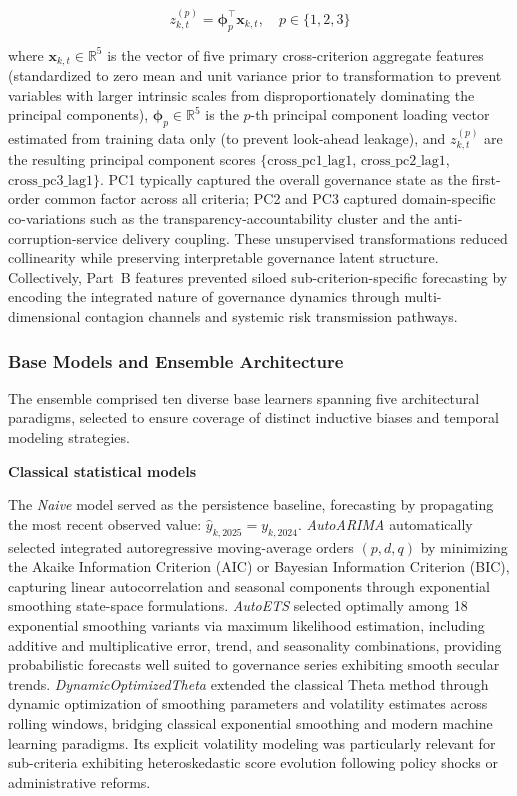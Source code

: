 \documentclass[12pt,a4paper]{article}
\begin{document}
\begin{equation}
\label{eq:pca}
z_{k,t}^{(p)} = \boldsymbol{\phi}_p^\top \mathbf{x}_{k,t}, \quad p \in \{1, 2, 3\}
\end{equation}

where $\mathbf{x}_{k,t} \in \mathbb{R}^{5}$ is the vector of five primary cross-criterion aggregate features (standardized to zero mean and unit variance prior to transformation to prevent variables with larger intrinsic scales from disproportionately dominating the principal components), $\boldsymbol{\phi}_p \in \mathbb{R}^{5}$ is the $p$-th principal component loading vector estimated from training data only (to prevent look-ahead leakage), and $z_{k,t}^{(p)}$ are the resulting principal component scores $\{\text{cross\_pc1\_lag1}$, $\text{cross\_pc2\_lag1}$, $\text{cross\_pc3\_lag1}\}$. PC1 typically captured the overall governance state as the first-order common factor across all criteria; PC2 and PC3 captured domain-specific co-variations such as the transparency-accountability cluster and the anti-corruption-service delivery coupling. These unsupervised transformations reduced collinearity while preserving interpretable governance latent structure. Collectively, Part~B features prevented siloed sub-criterion-specific forecasting by encoding the integrated nature of governance dynamics through multi-dimensional contagion channels and systemic risk transmission pathways.

\subsubsection{Base Models and Ensemble Architecture}
\label{subsubsec:base_models}

The ensemble comprised ten diverse base learners spanning five architectural paradigms, selected to ensure coverage of distinct inductive biases and temporal modeling strategies.

\textbf{Classical statistical models}

The \emph{Naive} model served as the persistence baseline, forecasting by propagating the most recent observed value: $\hat{y}_{k,2025} = y_{k,2024}$. \emph{AutoARIMA} \citep{Hyndman2008} automatically selected integrated autoregressive moving-average orders $(p,d,q)$ by minimizing the Akaike Information Criterion (AIC) or Bayesian Information Criterion (BIC), capturing linear autocorrelation and seasonal components through exponential smoothing state-space formulations. \emph{AutoETS} selected optimally among 18 exponential smoothing variants via maximum likelihood estimation, including additive and multiplicative error, trend, and seasonality combinations, providing probabilistic forecasts well suited to governance series exhibiting smooth secular trends. \emph{DynamicOptimizedTheta} extended the classical Theta method through dynamic optimization of smoothing parameters and volatility estimates across rolling windows, bridging classical exponential smoothing and modern machine learning paradigms. Its explicit volatility modeling was particularly relevant for sub-criteria exhibiting heteroskedastic score evolution following policy shocks or administrative reforms.
\end{document}
